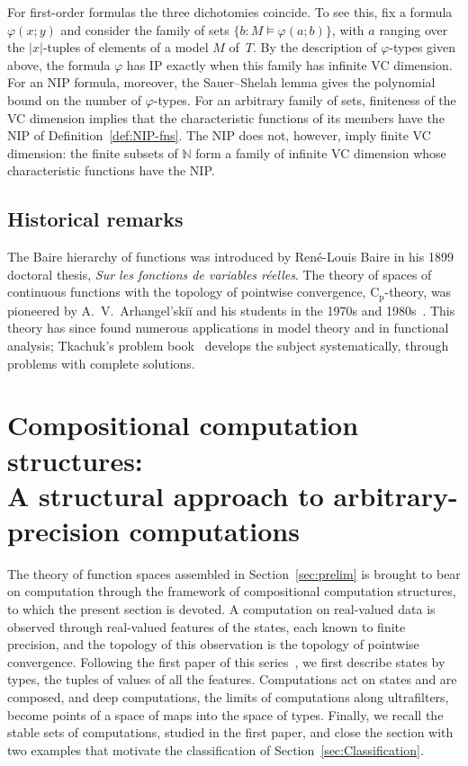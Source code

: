 \documentclass[psamsfonts]{amsart}
\theoremstyle{definition}
\theoremstyle{remark}
\newcommand{\Cp}{\mathrm{C}_{\mathrm{p}}}
\numberwithin{equation}{section}
\begin{document}
For first-order formulas the three dichotomies coincide.
To see this, fix a formula $\varphi(x;y)$ and consider the family of sets $\{b: M\models\varphi(a;b)\}$, with $a$ ranging over the $|x|$-tuples of elements of a model $M$ of~$T$.
By the description of $\varphi$-types given above, the formula $\varphi$ has IP exactly when this family has infinite VC dimension.
For an NIP formula, moreover, the Sauer--Shelah lemma gives the polynomial bound on the number of $\varphi$-types.
For an arbitrary family of sets, finiteness of the VC dimension implies that the characteristic functions of its members have the NIP of Definition~\ref{def:NIP-fns}.
The NIP does not, however, imply finite VC dimension: the finite subsets of $\mathbb{N}$ form a family of infinite VC dimension whose characteristic functions have the NIP.

\subsection*{Historical remarks}
The Baire hierarchy of functions was introduced by René-Louis Baire in his 1899 doctoral thesis, \emph{Sur les fonctions de variables réelles}.
The theory of spaces of continuous functions with the topology of pointwise convergence, $\Cp$-theory, was pioneered by A.~V.~Arhangel’skiĭ and his students in the 1970s and 1980s~\cite{Arkhangelskii:1992}.
This theory has since found numerous applications in model theory and in functional analysis;
Tkachuk’s problem book~\cite{tkachuk2011cp} develops the subject systematically, through problems with complete solutions.

\section{Compositional computation structures: \\
  A structural approach to arbitrary-precision computations}
\label{sec:CCS}

The theory of function spaces assembled in Section~\ref{sec:prelim} is brought to bear on computation through the framework of compositional computation structures, to which the present section is devoted.
A computation on real-valued data is observed through real-valued features of the states, each known to finite precision, and the topology of this observation is the topology of pointwise convergence.
Following the first paper of this series~\cite{alva2024approximability}, we first describe states by types, the tuples of values of all the features.
Computations act on states and are composed, and deep computations, the limits of computations along ultrafilters, become points of a space of maps into the space of types.
Finally, we recall the stable sets of computations, studied in the first paper, and close the section with two examples that motivate the classification of Section~\ref{sec:Classification}.
\end{document}
